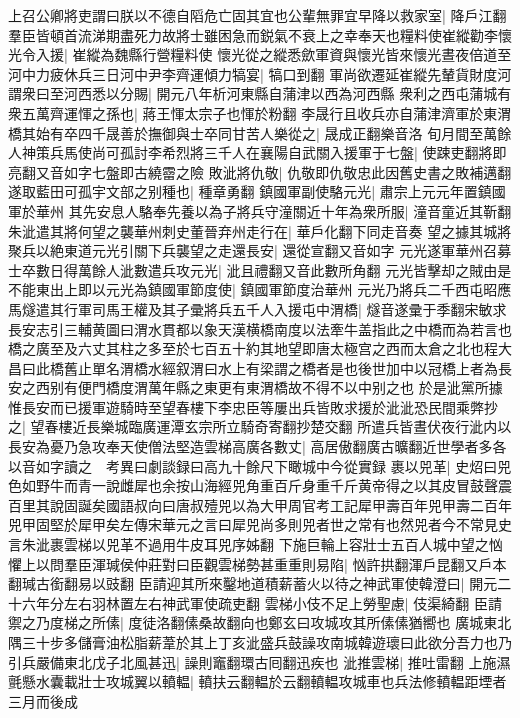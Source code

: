 上召公卿將吏謂曰朕以不德自䧟危亡固其宜也公輩無罪宜早降以救家室|{
	降戶江翻}
羣臣皆頓首流涕期盡死力故將士雖困急而鋭氣不衰上之幸奉天也糧料使崔縱勸李懷光令入援|{
	崔縱為魏縣行營糧料使}
懷光從之縱悉歛軍資與懷光皆來懷光晝夜倍道至河中力疲休兵三日河中尹李齊運傾力犒宴|{
	犒口到翻}
軍尚欲遷延崔縱先輦貨財度河謂衆曰至河西悉以分賜|{
	開元八年析河東縣自蒲津以西為河西縣}
衆利之西屯蒲城有衆五萬齊運惲之孫也|{
	蔣王惲太宗子也惲於粉翻}
李晟行且收兵亦自蒲津濟軍於東渭橋其始有卒四千晟善於撫御與士卒同甘苦人樂從之|{
	晟成正翻樂音洛}
旬月間至萬餘人神策兵馬使尚可孤討李希烈將三千人在襄陽自武關入援軍于七盤|{
	使踈吏翻將即亮翻又音如字七盤即古繞霤之險}
敗泚將仇敬|{
	仇敬即仇敬忠此因舊史書之敗補邁翻}
遂取藍田可孤宇文部之别種也|{
	種章勇翻}
鎮國軍副使駱元光|{
	肅宗上元元年置鎮國軍於華州}
其先安息人駱奉先養以為子將兵守潼關近十年為衆所服|{
	潼音童近其靳翻}
朱泚遣其將何望之襲華州刺史董晉弃州走行在|{
	華戶化翻下同走音奏}
望之據其城將聚兵以絶東道元光引關下兵襲望之走還長安|{
	還從宣翻又音如字}
元光遂軍華州召募士卒數日得萬餘人泚數遣兵攻元光|{
	泚且禮翻又音此數所角翻}
元光皆擊却之賊由是不能東出上即以元光為鎮國軍節度使|{
	鎮國軍節度治華州}
元光乃將兵二千西屯昭應馬燧遣其行軍司馬王權及其子彚將兵五千人入援屯中渭橋|{
	燧音遂彚于季翻宋敏求長安志引三輔黄圖曰渭水貫都以象天漢横橋南度以法牽牛盖指此之中橋而為若言也橋之廣至及六丈其柱之多至於七百五十約其地望即唐太極宫之西而太倉之北也程大昌曰此橋舊止單名渭橋水經叙渭曰水上有梁謂之橋者是也後世加中以冠橋上者為長安之西别有便門橋度渭萬年縣之東更有東渭橋故不得不以中别之也}
於是泚黨所據惟長安而已援軍遊騎時至望春樓下李忠臣等屢出兵皆敗求援於泚泚恐民間乘弊抄之|{
	望春樓近長樂城臨廣運潭玄宗所立騎奇寄翻抄楚交翻}
所遣兵皆晝伏夜行泚内以長安為憂乃急攻奉天使僧法堅造雲梯高廣各數丈|{
	高居傲翻廣古曠翻近世學者多各以音如字讀之　考異曰劇談録曰高九十餘尺下瞰城中今從實録}
裹以兕革|{
	史炤曰兕色如野牛而青一說雌犀也余按山海經兕角重百斤身重千斤黄帝得之以其皮冒鼓聲震百里其說固誕矣國語叔向曰唐叔殪兕以為大甲周官考工記犀甲壽百年兕甲壽二百年兕甲固堅於犀甲矣左傳宋華元之言曰犀兕尚多則兕者世之常有也然兕者今不常見史言朱泚裹雲梯以兕革不過用牛皮耳兕序姊翻}
下施巨輪上容壯士五百人城中望之忷懼上以問羣臣渾瑊侯仲莊對曰臣觀雲梯勢甚重重則易陷|{
	忷許拱翻渾戶昆翻又戶本翻瑊古銜翻易以豉翻}
臣請迎其所來鑿地道積薪蓄火以待之神武軍使韓澄曰|{
	開元二十六年分左右羽林置左右神武軍使疏吏翻}
雲梯小伎不足上勞聖慮|{
	伎渠綺翻}
臣請禦之乃度梯之所傃|{
	度徒洛翻傃桑故翻向也鄭玄曰攻城攻其所傃傃猶嚮也}
廣城東北隅三十步多儲膏油松脂薪葦於其上丁亥泚盛兵鼓譟攻南城韓遊瓌曰此欲分吾力也乃引兵嚴備東北戊子北風甚迅|{
	譟則竈翻環古囘翻迅疾也}
泚推雲梯|{
	推吐雷翻}
上施濕氈懸水囊載壯士攻城翼以轒輼|{
	轒扶云翻輼於云翻轒輼攻城車也兵法修轒輼距堙者三月而後成}
